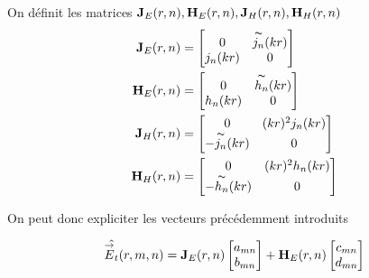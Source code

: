         \begin{defn}
            On définit les matrices \(\mathbf{J}_{E}(r,n),\mathbf{H}_{E}(r,n),\mathbf{J}_{H}(r,n),\mathbf{H}_{H}(r,n)\)
            \begin{align}
                \mathbf{J}_{E}(r,n) &=
                \begin{bmatrix}
                    0 & \overset{\thicksim}{j_n}(kr)
                    \\
                    j_n(kr) & 0
                \end{bmatrix}
                \\
                \mathbf{H}_{E}(r,n) &=
                \begin{bmatrix}
                    0 & \overset{\thicksim}{h_n}(kr)
                    \\
                    h_n(kr) & 0
                \end{bmatrix}
                \\
                \mathbf{J}_{H}(r,n) &=
                \begin{bmatrix}
                    0 & (kr)^2 j_n(kr)
                    \\
                    -\overset{\thicksim}{j_n}(kr) & 0
                \end{bmatrix}
                \\
                \mathbf{H}_{H}(r,n) &=
                \begin{bmatrix}
                    0 & (kr)^2 h_n(kr)
                    \\
                    -\overset{\thicksim}{h_n}(kr) & 0
                \end{bmatrix}
            \end{align}
        \end{defn}

        On peut donc expliciter les vecteurs précédemment introduits

        \begin{equation}
            \hat{{\overset{\rightarrow}{E}}_t}(r,m,n) =
            \mathbf{J}_{E}(r,n)
            \begin{bmatrix}
                a_{mn}
                \\
                b_{mn}
            \end{bmatrix}
            +
            \mathbf{H}_{E}(r,n)
            \begin{bmatrix}
                c_{mn}
                \\
                d_{mn}
            \end{bmatrix}
        \end{equation}

